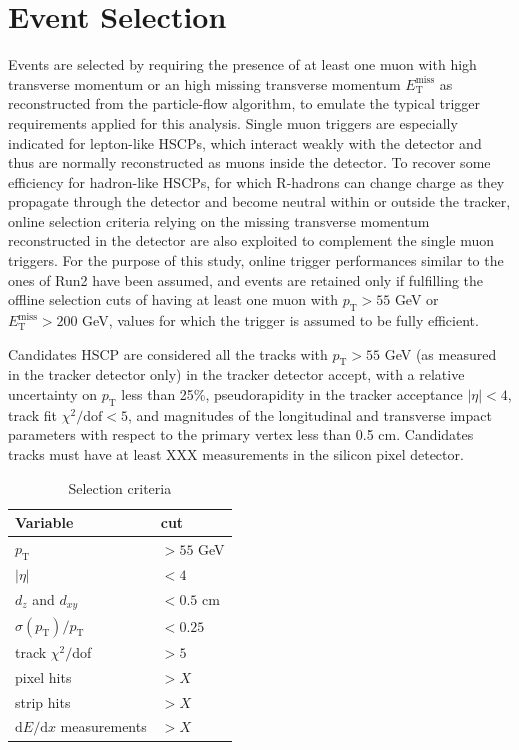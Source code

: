 \documentclass[11pt,twoside,a4paper]{article}
\begin{document}
\section{Event Selection}

Events are selected by requiring the presence of at least one muon with high transverse momentum or an high missing transverse momentum $E_{\mathrm{T}}^{\mathrm{miss}}$ as reconstructed from the particle-flow algorithm, to emulate the typical trigger requirements applied for this analysis.
Single muon triggers are especially indicated for lepton-like HSCPs, which interact weakly with the detector and thus are normally reconstructed as muons inside the detector.
To recover some efficiency for hadron-like HSCPs, for which R-hadrons can change charge as they propagate through the detector and become neutral within or outside the tracker, online selection criteria relying on the missing transverse momentum reconstructed in the detector are also exploited to complement the single muon triggers.
For the purpose of this study, online trigger performances similar to the ones of Run2 have been assumed, and events are retained only if fulfilling the offline selection cuts of having at least one muon with $p_{\mathrm{T}} > 55$ GeV or $E_{\mathrm{T}}^{\mathrm{miss}} > 200$ GeV, values for which the trigger is assumed to be fully efficient. 

Candidates HSCP are considered all the tracks with $p_{\mathrm{T}} > 55$ GeV (as measured in the tracker detector only) in the tracker detector accept, with a relative uncertainty on $p_{\mathrm{T}}$ less than 25\%, pseudorapidity in the tracker acceptance $|\eta| < 4$, track fit $\chi^2/\mathrm{dof} < 5$, and magnitudes of the longitudinal and transverse impact parameters with respect to the primary vertex less than 0.5 cm. 
Candidates tracks must have at least XXX measurements in the silicon pixel detector.

\begin{table}
 \centering
 \caption{Selection criteria\label{tab:selection}}
 \begin{tabular}{ll}
  \toprule
  Variable 			& cut \\ 
  \midrule	
  $p_{\mathrm{T}}$		& $> 55$ GeV \\
  $|\eta|$			& $< 4$ \\
  $d_z$ and $d_{xy}$		& $< 0.5$ cm \\
  $\sigma(p_{\mathrm{T}})/p_{\mathrm{T}}$		& $< 0.25$ \\
  track $\chi^2/$dof		& $> 5$ \\
  pixel hits			& $> X$ \\
  strip hits			& $> X$ \\
  $\mathrm{d}E/\mathrm{d}x$ measurements			& $> X$ \\
  \bottomrule
 \end{tabular}
\end{table}
\end{document}
